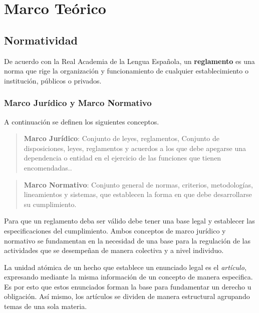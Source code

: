 \chapter{Marco Teórico}

%
%

\section{Normatividad}

De acuerdo con la Real Academia de la Lengua Española, un \textbf{reglamento} es una norma que rige la organización y funcionamiento de cualquier establecimiento o institución, públicos o privados. \parencite{rae}

\subsection{Marco Jurídico y Marco Normativo}

A continuación se definen los siguientes conceptos.

\begin{quote}
\textbf{Marco Jurídico}: Conjunto de leyes, reglamentos, Conjunto de disposiciones, leyes, reglamentos y acuerdos a los que debe apegarse una dependencia o entidad en el ejercicio de las funciones que tienen encomendadas.. \parencite{riverarobles}
\end{quote}

\begin{quote}
\textbf{Marco Normativo}: Conjunto general de normas, criterios, metodologías, lineamientos y sistemas, que establecen la forma en que debe desarrollarse su cumplimiento. \parencite{diccionariomarconormativo}
\end{quote}

Para que un reglamento deba ser válido debe tener una base legal y establecer las especificaciones del cumplimiento. Ambos conceptos de marco jurídico y normativo se fundamentan en la necesidad de una base para la regulación de las actividades que se desempeñan de manera colectiva y a nivel individuo.

La unidad atómica de un hecho que establece un enunciado legal es el \textit{artículo}, expresando mediante la misma información de un concepto de manera especifica. Es por esto que estos enunciados forman la base para fundamentar un derecho u obligación. Así mismo, los artículos se dividen de manera estructural agrupando temas de una sola materia.

